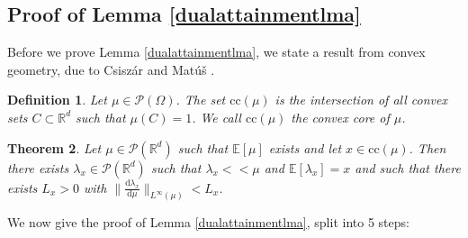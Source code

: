 \documentclass[10pt,a4paper]{amsart}
\newcommand{\RR}{\mathbb{R}}
\newcommand{\EE}{\mathbb{E}}
\newcommand{\dd}{\mathrm{d}}
\newtheorem{thm}{Theorem}[section]
\newtheorem{definition}[thm]{Definition}
\begin{document}
\subsection{Proof of Lemma \ref{dualattainmentlma}}
Before we prove Lemma \ref{dualattainmentlma}, we state a result from convex geometry, due to Csiszár and Matú\v{s} \cite{csiszar2001}.
\begin{definition}\cite[p 177]{csiszar2001}
	Let $\mu\in\mathcal P(\Omega)$. The set $\text{cc}(\mu)$ is the intersection of all convex sets $C\subset\RR^d$ such that $\mu(C)=1$. We call $\text{cc}(\mu)$ the \textit{convex core of $\mu$}.
\end{definition}
\begin{thm}\cite[Thm 3]{csiszar2001}\label{csiszarthm}
	Let $\mu\in\mathcal P(\RR^d)$ such that $\EE[\mu]$ exists and let $x\in\text{cc}(\mu)$. Then there exists $\lambda_x\in\mathcal P(\RR^d)$ such that $\lambda_x<<\mu$ and $\EE[\lambda_x]=x$ and such that there exists $L_x>0$ with $\|\frac{\dd\lambda_x}{\dd\mu}\|_{L^\infty(\mu)}<L_x$.
\end{thm}
We now give the proof of Lemma \ref{dualattainmentlma}, split into 5 steps:
\end{document}
